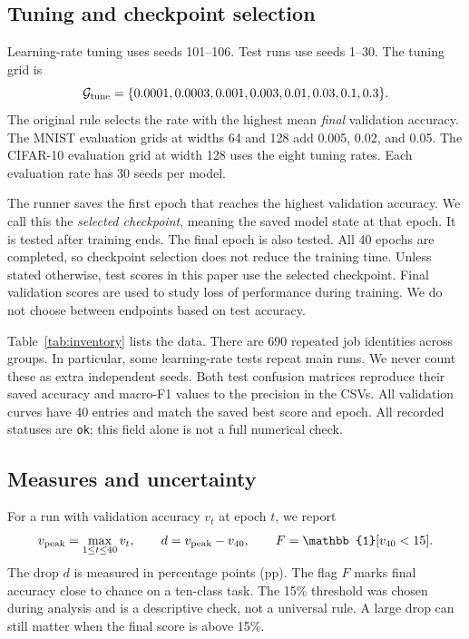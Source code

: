 \documentclass[10pt]{article}
\begin{document}
\subsection{Tuning and checkpoint selection}
Learning-rate tuning uses seeds 101--106. Test runs use seeds 1--30. The tuning grid is
\begin{equation}
\mathcal{G}_{\rm tune}=\{0.0001,0.0003,0.001,0.003,0.01,0.03,0.1,0.3\}.
\end{equation}
The original rule selects the rate with the highest mean \emph{final} validation accuracy. The MNIST evaluation grids at widths 64 and 128 add 0.005, 0.02, and 0.05. The CIFAR-10 evaluation grid at width 128 uses the eight tuning rates. Each evaluation rate has 30 seeds per model.

The runner saves the first epoch that reaches the highest validation accuracy. We call this the \emph{selected checkpoint}, meaning the saved model state at that epoch. It is tested after training ends. The final epoch is also tested. All 40 epochs are completed, so checkpoint selection does not reduce the training time. Unless stated otherwise, test scores in this paper use the selected checkpoint. Final validation scores are used to study loss of performance during training. We do not choose between endpoints based on test accuracy.

Table~\ref{tab:inventory} lists the data. There are 690 repeated job identities across groups. In particular, some learning-rate tests repeat main runs. We never count these as extra independent seeds. Both test confusion matrices reproduce their saved accuracy and macro-F1 values to the precision in the CSVs. All validation curves have 40 entries and match the saved best score and epoch. All recorded statuses are \texttt{ok}; this field alone is not a full numerical check.

\subsection{Measures and uncertainty}
For a run with validation accuracy $v_t$ at epoch $t$, we report
\begin{equation}
v_{\rm peak}=\max_{1\leq t\leq40}v_t,\qquad
d=v_{\rm peak}-v_{40},\qquad
F=\mathbb{1}[v_{40}<15].
\label{eq:failure}
\end{equation}
The drop $d$ is measured in percentage points (pp). The flag $F$ marks final accuracy close to chance on a ten-class task. The 15\% threshold was chosen during analysis and is a descriptive check, not a universal rule. A large drop can still matter when the final score is above 15\%.
\end{document}

